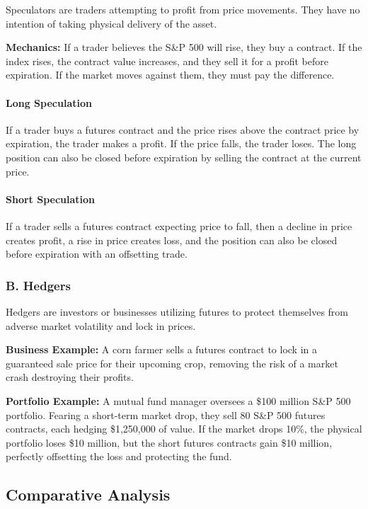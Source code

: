 \documentclass[12pt,openany]{book}
\begin{document}
Speculators are traders attempting to profit from price movements. They have no intention of taking physical delivery of the asset.

\textbf{Mechanics:} If a trader believes the S\&P 500 will rise, they buy a contract. If the index rises, the contract value increases, and they sell it for a profit before expiration. If the market moves against them, they must pay the difference.

\paragraph{Long Speculation}

If a trader buys a futures contract and the price rises above the contract price by expiration, the trader makes a profit. If the price falls, the trader loses. The long position can also be closed before expiration by selling the contract at the current price.

\paragraph{Short Speculation}

If a trader sells a futures contract expecting price to fall, then a decline in price creates profit, a rise in price creates loss, and the position can also be closed before expiration with an offsetting trade.

\subsubsection{B. Hedgers}

Hedgers are investors or businesses utilizing futures to protect themselves from adverse market volatility and lock in prices.

\textbf{Business Example:} A corn farmer sells a futures contract to lock in a guaranteed sale price for their upcoming crop, removing the risk of a market crash destroying their profits.

\textbf{Portfolio Example:} A mutual fund manager oversees a \$100 million S\&P 500 portfolio. Fearing a short-term market drop, they sell 80 S\&P 500 futures contracts, each hedging \$1,250,000 of value. If the market drops 10\%, the physical portfolio loses \$10 million, but the short futures contracts gain \$10 million, perfectly offsetting the loss and protecting the fund.

\subsection{Comparative Analysis}
\end{document}
